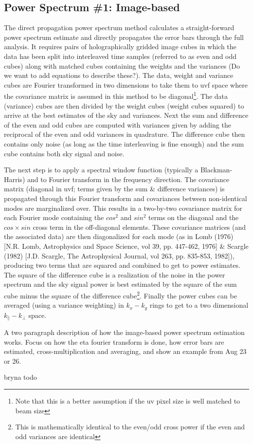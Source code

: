 \subsection{Power Spectrum \#1: Image-based}
The direct propagation power spectrum method calculates a straight-forward power spectrum estimate and directly propagates the error bars through the full analysis. It requires pairs of holographically gridded image cubes in which the data has been split into interleaved time samples (referred to as even and odd cubes) along with matched cubes containing the weights and the variances (Do we want to add equations to describe these?).  The data, weight and variance cubes are Fourier transformed in two dimensions to take them to uvf space where the covariance matrix is assumed in this method to be diagonal\footnote{Note that this is a better assumption if the uv pixel size is well matched to beam size}. The data (variance) cubes are then divided by the weight cubes (weight cubes squared) to arrive at the best estimates of the sky and variances. Next the sum and difference of the even and odd cubes are computed with variances given by adding the reciprocal of the even and odd variances in quadrature. The difference cube then contains only noise (as long as the time interleaving is fine enough) and the sum cube contains both sky signal and noise.

The next step is to apply a spectral window function (typically a Blackman-Harris) and to Fourier transform in the frequency direction. The covariance matrix (diagonal in uvf; terms given by the sum & difference variances) is propagated through this Fourier transform and covariances between non-identical modes are marginalized over. This results in a two-by-two covariance matrix for each Fourier mode containing the $cos^2$ and $sin^2$ terms on the diagonal and the $cos\times sin$ cross term in the off-diagonal elements. These covariance matrices (and the associated data) are then diagonalized for each mode (as in Lomb (1976) [N.R. Lomb, Astrophysics and Space Science, vol 39, pp. 447-462, 1976] & Scargle (1982) [J.D. Scargle, The Astrophysical Journal, vol 263, pp. 835-853, 1982]), producing two terms that are squared and combined to get to power estimates. The square of the difference cube is a realization of the noise in the power spectrum and the sky signal power is best estimated by the square of the sum cube minus the square of the difference cube\footnote{This is mathematically identical to the even/odd cross power if the even and odd variances are identical}. Finally the power cubes can be averaged (using a variance weighting) in $k_x-k_y$ rings to get to a two dimensional $k_{\|}-k_{\bot}$ space.


A two paragraph description of how the image-based power spectrum estimation works. Focus on how the eta fourier transform is done, how error bars are estimated, cross-multiplication and averaging, and show an example from Aug 23 or 26.

bryna todo